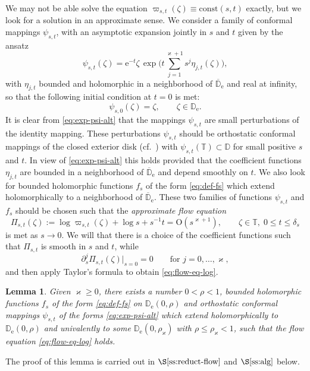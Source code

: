 \documentclass{amsart}
\newcommand{\be}{\begin{equation}}
\newcommand{\ee}{\end{equation}}
\newcommand{\D}{\mathbb{D}}
\newcommand{\T}{\mathbb{T}}
\newtheorem{lem}[thm]{Lemma}
\theoremstyle{definition}
\theoremstyle{remark}
\newcommand{\e}{\mathrm{e}}
\newcommand{\Ordo}{\mathrm{O}}
\numberwithin{equation}{subsection}
\begin{document}
We may not be able solve the equation
$\varpi_{s,t}(\zeta)\equiv \text{const}(s,t)$ exactly,
but we look for a solution in an approximate sense. 
We consider a family of conformal mappings $\psi_{s,t}$, with an
asymptotic expansion jointly in $s$ and $t$ given by the ansatz
\be\label{eq:exp-psi-alt}
\psi_{s,t}(\zeta)=\e^{-t}\zeta\,\exp\Big(t\sum_{j=1}^{\varkappa+1}s^{j}\eta_{j,t}(\zeta)\Big),
\ee
with $\eta_{j,t}$ bounded and holomorphic in a 
neighborhood of $\overline{\D}_\e$ and real at infinity,
so that the following initial condition at $t=0$ is met:
\be\label{eq:init-cond-fol}
\psi_{s,0}(\zeta)=\zeta,\qquad \zeta\in\D_\e.
\ee
It is clear from \eqref{eq:exp-psi-alt} that the mappings $\psi_{s,t}$
are small perturbations of the identity mapping.
These perturbations $\psi_{s,t}$ should be orthostatic conformal mappings 
of the closed exterior disk (cf.\ \cite[Lemma~6.2.5]{HW-ONP})
with $\psi_{s,t}(\T)\subset \D$ for small positive $s$ and $t$. 
In view of \eqref{eq:exp-psi-alt}
this holds provided that the coefficient functions $\eta_{j,t}$
are bounded in a neighborhood of $\overline{\D}_\e$ and depend smoothly on $t$.
We also look for bounded holomorphic functions 
$f_{s}$ of the form \eqref{eq:def-fs}
which extend holomorphically to a neighborhood of $\overline{\D}_\e$.
These two families of functions $\psi_{s,t}$ and $f_s$ should be chosen
such that the {\em approximate flow equation}
\be\label{eq:flow-eq-log}
\Pi_{s,t}(\zeta):=\log\varpi_{s,t}(\zeta)+\log{s}+s^{-1}t = \Ordo(s^{\varkappa+1}),  
\qquad \zeta\in\T,\;0\le t\le\delta_s
\ee
is met as $s\to0$. We will that there is a choice of the coefficient
functions such that $\Pi_{s,t}$ is smooth in $s$ and $t$, while
\be\label{eq:flow-eq-log-diff}
\partial^j_s\Pi_{s,t}(\zeta)\vert_{s=0}=0\qquad \text{for }j=0,\ldots,\varkappa,
\ee
and then apply Taylor's formula to obtain \eqref{eq:flow-eq-log}.

\begin{lem}\label{lem:flow}
Given $\varkappa\ge0$, there exists a number $0<\rho<1$,  bounded holomorphic functions 
$f_s$ of the form \eqref{eq:def-fs}
on $\D_\e(0,\rho)$ and
orthostatic conformal mappings $\psi_{s,t}$ of the forms 
\eqref{eq:exp-psi-alt} which extend holomorphically to 
$\D_\e(0,\rho)$ and univalently to some $\D_\e(0,\rho_\varkappa)$
with $\rho\le \rho_\varkappa<1$,
such that the flow equation \eqref{eq:flow-eq-log} holds.
\end{lem}

The proof of this lemma is carried out in 
$\S\ref{ss:reduct-flow}$ and $\S\ref{ss:alg}$ below.
\end{document}

